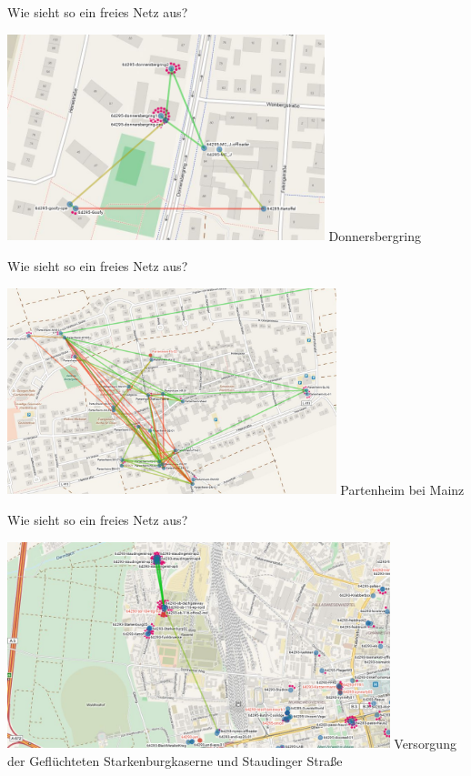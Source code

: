 \documentclass[10pt]{beamer}
\begin{document}
    \begin{frame}{Wie sieht so ein freies Netz aus?}
      \begin{center}
        \includegraphics[height=6cm]{images/2016-02-17_donnersbergring}
        \vfill Donnersbergring
      \end{center}
    \end{frame}

    \begin{frame}{Wie sieht so ein freies Netz aus?}
      \begin{center}
        \includegraphics[height=6cm]{images/2015-10_partenheim-map}
        \vfill Partenheim bei Mainz
      \end{center}
    \end{frame}

    \begin{frame}{Wie sieht so ein freies Netz aus?}
      \begin{center}
        \includegraphics[height=6cm]{images/2016-02-17_starkenburk-link}
        \vfill Versorgung der Geflüchteten
        \vfill \small Starkenburgkaserne und Staudinger Straße
      \end{center}
    \end{frame}
\end{document}
